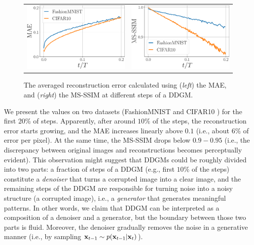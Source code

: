      \begin{figure}[t]
     \centering
    \begin{tabular}{cc}
        \includegraphics[width=.38\textwidth]{pics/4_daed/experiments/MAE_step.pdf} &
        \includegraphics[width=.38\textwidth]{pics/4_daed/experiments/MSSSIM_step.pdf} \\
    \end{tabular}
    \caption{The averaged reconstruction error calculated using (\textit{left}) the MAE, and (\textit{right}) the MS-SSIM at different steps of a DDGM.}
    \label{fig:reconstruction_error_analysis}
    \vspace*{\baselineskip}
     \end{figure}


We present the values on two datasets (FashionMNIST \citep{xiao2017fashion}  and CIFAR10 \citep{Krizhevsky09learningmultiple}) for the first 20\% of steps. Apparently, after around $10\%$ of the steps, the reconstruction error starts growing, and the MAE increases linearly above $0.1$ (i.e., about $6\%$ of error per pixel). At the same time, the MS-SSIM drops below $0.9-0.95$ (i.e., the discrepancy between original images and reconstructions becomes perceptually evident). This observation might suggest that DDGMs could be roughly divided into two parts: a fraction of steps of a DDGM (e.g., first $10\%$ of the steps) constitute a \textit{denoiser} that turns a corrupted image into a clear image, and the remaining steps of the DDGM are responsible for turning noise into a noisy structure (a corrupted image), i.e., a \textit{generator} that generates meaningful patterns. In other words, we claim that DDGM can be interpreted as a composition of a denoiser and a generator, but the boundary between those two parts is fluid. Moreover, the denoiser gradually removes the noise in a generative manner (i.e., by sampling ${\mathbf{x}}_{t-1} \sim p({\mathbf{x}}_{t-1}|{\mathbf{x}}_t)$).


